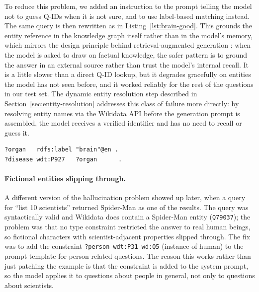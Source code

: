\documentclass[11pt,a4paper]{article}
\begin{document}
To reduce this problem, we added an instruction to the prompt telling
the model not to guess Q-IDs when it is not sure, and to use
label-based matching instead. The same query is then rewritten as in
Listing~\ref{lst:brain-good}. This grounds the entity reference in
the knowledge graph itself rather than in the model's memory, which
mirrors the design principle behind retrieval-augmented generation
\cite{lewis2020rag}: when the model is asked to draw on factual
knowledge, the safer pattern is to ground the answer in an external
source rather than trust the model's internal recall. It is a little
slower than a direct Q-ID lookup, but it degrades gracefully on
entities the model has not seen before, and it worked reliably for
the rest of the questions in our test set. The dynamic entity
resolution step described in Section~\ref{sec:entity-resolution}
addresses this class of failure more directly: by resolving entity
names via the Wikidata API before the generation prompt is
assembled, the model receives a verified identifier and has no need
to recall or guess it.

\begin{lstlisting}[style=sparqlStyle, caption={Label-based fallback
that avoids depending on memorised Q-IDs.},
label={lst:brain-good}]
?organ   rdfs:label "brain"@en .
?disease wdt:P927   ?organ      .
\end{lstlisting}

\paragraph{Fictional entities slipping through.}
A different version of the hallucination problem showed up later,
when a query for ``list 10 scientists'' returned Spider-Man as one
of the results. The query was syntactically valid and Wikidata does
contain a Spider-Man entity (\texttt{Q79037}); the problem was that
no type constraint restricted the answer to real human beings, so
fictional characters with scientist-adjacent properties slipped
through. The fix was to add the constraint
\texttt{?person\,wdt:P31\,wd:Q5} (instance of human) to the prompt
template for person-related questions. The reason this works rather
than just patching the example is that the constraint is added
to the system prompt, so the model applies it to questions about
people in general, not only to questions about scientists.
\end{document}
